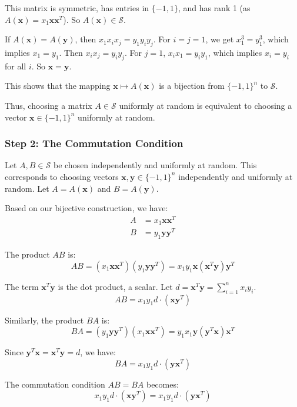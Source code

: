 \documentclass[12pt,a4paper]{article}
\theoremstyle{definition}
\begin{document}
        This matrix is symmetric, has entries in $\{-1, 1\}$, and has rank 1 (as $A(\mathbf{x}) = x_1 \mathbf{x} \mathbf{x}^T$). So $A(\mathbf{x}) \in \mathcal{S}$.

        If $A(\mathbf{x}) = A(\mathbf{y})$, then $x_1 x_i x_j = y_1 y_i y_j$. For $i=j=1$, we get $x_1^3 = y_1^3$, which implies $x_1=y_1$. Then $x_i x_j = y_i y_j$. For $j=1$, $x_i x_1 = y_i y_1$, which implies $x_i = y_i$ for all $i$. So $\mathbf{x}=\mathbf{y}$.

        This shows that the mapping $\mathbf{x} \mapsto A(\mathbf{x})$ is a bijection from $\{-1, 1\}^n$ to $\mathcal{S}$.

        Thus, choosing a matrix $A \in \mathcal{S}$ uniformly at random is equivalent to choosing a vector $\mathbf{x} \in \{-1, 1\}^n$ uniformly at random.

        \subsubsection*{Step 2: The Commutation Condition}

        Let $A, B \in \mathcal{S}$ be chosen independently and uniformly at random. This corresponds to choosing vectors $\mathbf{x}, \mathbf{y} \in \{-1, 1\}^n$ independently and uniformly at random. Let $A = A(\mathbf{x})$ and $B = A(\mathbf{y})$.

        Based on our bijective construction, we have:
        \begin{align}
            A &= x_1 \mathbf{x}\mathbf{x}^T\\
            B &= y_1 \mathbf{y}\mathbf{y}^T
        \end{align}

        The product $AB$ is:
        $$AB = (x_1 \mathbf{x}\mathbf{x}^T)(y_1 \mathbf{y}\mathbf{y}^T) = x_1 y_1 \mathbf{x}(\mathbf{x}^T\mathbf{y})\mathbf{y}^T$$

        The term $\mathbf{x}^T\mathbf{y}$ is the dot product, a scalar. Let $d = \mathbf{x}^T\mathbf{y} = \sum_{i=1}^n x_i y_i$.
        $$AB = x_1 y_1 d \cdot (\mathbf{x}\mathbf{y}^T)$$

        Similarly, the product $BA$ is:
        $$BA = (y_1 \mathbf{y}\mathbf{y}^T)(x_1 \mathbf{x}\mathbf{x}^T) = y_1 x_1 \mathbf{y}(\mathbf{y}^T\mathbf{x})\mathbf{x}^T$$

        Since $\mathbf{y}^T\mathbf{x} = \mathbf{x}^T\mathbf{y} = d$, we have:
        $$BA = x_1 y_1 d \cdot (\mathbf{y}\mathbf{x}^T)$$

        The commutation condition $AB=BA$ becomes:
        $$x_1 y_1 d \cdot (\mathbf{x}\mathbf{y}^T) = x_1 y_1 d \cdot (\mathbf{y}\mathbf{x}^T)$$
\end{document}
